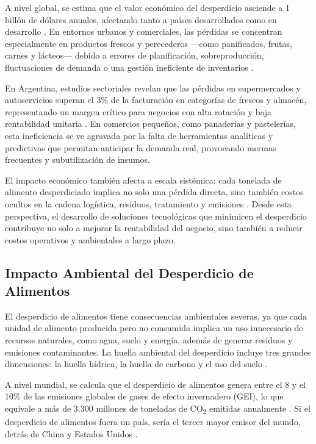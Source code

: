 A nivel global, se estima que el valor económico del desperdicio asciende a 1 billón de dólares anuales, afectando tanto a países desarrollados como en desarrollo \parencite{fao2013}. En entornos urbanos y comerciales, las pérdidas se concentran especialmente en productos frescos y perecederos —como panificados, frutas, carnes y lácteos— debido a errores de planificación, sobreproducción, fluctuaciones de demanda o una gestión ineficiente de inventarios \parencite{fao2019}.

En Argentina, estudios sectoriales revelan que las pérdidas en supermercados y autoservicios superan el 3\% de la facturación en categorías de frescos y almacén, representando un margen crítico para negocios con alta rotación y baja rentabilidad unitaria \parencite{weteam2021}. En comercios pequeños, como panaderías y pastelerías, esta ineficiencia se ve agravada por la falta de herramientas analíticas y predictivas que permitan anticipar la demanda real, provocando mermas frecuentes y subutilización de insumos.

El impacto económico también afecta a escala sistémica: cada tonelada de alimento desperdiciado implica no solo una pérdida directa, sino también costos ocultos en la cadena logística, residuos, tratamiento y emisiones \parencite{refed2016}. Desde esta perspectiva, el desarrollo de soluciones tecnológicas que minimicen el desperdicio contribuye no solo a mejorar la rentabilidad del negocio, sino también a reducir costos operativos y ambientales a largo plazo.

\subsection{Impacto Ambiental del Desperdicio de Alimentos}

El desperdicio de alimentos tiene consecuencias ambientales severas, ya que cada unidad de alimento producida pero no consumida implica un uso innecesario de recursos naturales, como agua, suelo y energía, además de generar residuos y emisiones contaminantes. La huella ambiental del desperdicio incluye tres grandes dimensiones: la huella hídrica, la huella de carbono y el uso del suelo \parencite{fao2013}.

A nivel mundial, se calcula que el desperdicio de alimentos genera entre el 8 y el 10\% de las emisiones globales de gases de efecto invernadero (GEI), lo que equivale a más de 3.300 millones de toneladas de CO\textsubscript{2} emitidas anualmente \parencite{unep2021}. Si el desperdicio de alimentos fuera un país, sería el tercer mayor emisor del mundo, detrás de China y Estados Unidos \parencite{fao2013}.


